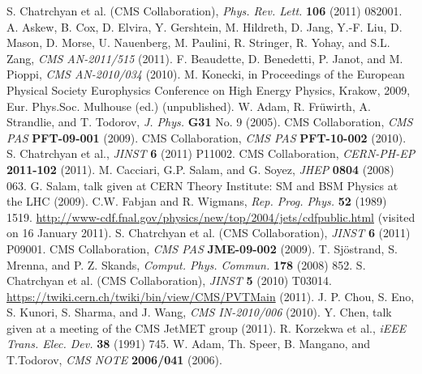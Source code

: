 \documentclass[12pt, letterpaper]{report}
\begin{document}
\begin{thebibliography}{99}
 S. Chatrchyan et al. (CMS Collaboration), \textit{Phys. Rev. Lett.} \textbf{106} (2011) 082001.
 A. Askew, B. Cox, D. Elvira, Y. Gershtein, M. Hildreth, D. Jang, Y.-F. Liu, D. Mason, D. Morse, U. Nauenberg, M. Paulini, R. Stringer, R. Yohay, and S.L. Zang, \textit{CMS AN-2011/515} (2011).
 F. Beaudette, D. Benedetti, P. Janot, and M. Pioppi, \textit{CMS AN-2010/034} (2010).
 M. Konecki, in Proceedings of the European Physical Society  Europhysics Conference on High Energy Physics, Krakow, 2009, Eur. Phys.Soc. Mulhouse (ed.) (unpublished).
 W. Adam, R. Fr\"uwirth, A. Strandlie, and T. Todorov, \textit{J. Phys.} \textbf{G31} No. 9 (2005).
 CMS Collaboration, \textit{CMS PAS} \textbf{PFT-09-001} (2009).
 CMS Collaboration, \textit{CMS PAS} \textbf{PFT-10-002} (2010).
 S. Chatrchyan et al., \textit{JINST} \textbf{6} (2011) P11002.
 CMS Collaboration, \textit{CERN-PH-EP} \textbf{2011-102} (2011).
 M. Cacciari, G.P. Salam, and G. Soyez, \textit{JHEP} \textbf{0804} (2008) 063.
 G. Salam, talk given at CERN Theory Institute: SM and BSM Physics at the LHC (2009).
 C.W. Fabjan and R. Wigmans, \textit{Rep. Prog. Phys.} \textbf{52} (1989) 1519.
 \url{http://www-cdf.fnal.gov/physics/new/top/2004/jets/cdfpublic.html} (visited on 16 January 2011).
 S. Chatrchyan et al. (CMS Collaboration), \textit{JINST} \textbf{6} (2011) P09001.
 CMS Collaboration, \textit{CMS PAS} \textbf{JME-09-002} (2009).
 T. Sj\"ostrand, S. Mrenna, and P. Z. Skands, \textit{Comput. Phys. Commun.} \textbf{178} (2008) 852.
 S. Chatrchyan et al. (CMS Collaboration), \textit{JINST} \textbf{5} (2010) T03014.
 \url{https://twiki.cern.ch/twiki/bin/view/CMS/PVTMain} (2011).
 J. P. Chou, S. Eno, S. Kunori, S. Sharma, and J. Wang, \textit{CMS IN-2010/006} (2010).
 Y. Chen, talk given at a meeting of the CMS JetMET group (2011).
 R. Korzekwa et al., \textit{iEEE Trans. Elec. Dev.} \textbf{38} (1991) 745.
 W. Adam, Th. Speer, B. Mangano, and T.Todorov, \textit{CMS NOTE} \textbf{2006/041} (2006).

\end{thebibliography}
\end{document}
